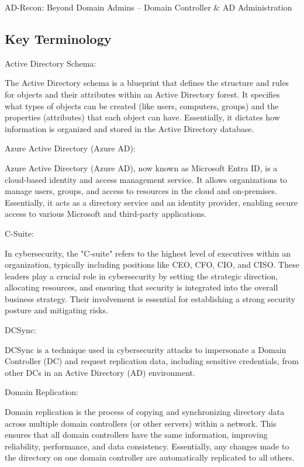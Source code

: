 
AD-Recon: Beyond Domain Admins – Domain Controller \& AD Administration

\subsection{Key Terminology}

Active Directory Schema:

The Active Directory schema is a blueprint that defines the structure and rules for objects and their attributes within an Active Directory forest. It specifies what types of objects can be created (like users, computers, groups) and the properties (attributes) that each object can have. Essentially, it dictates how information is organized and stored in the Active Directory database.

Azure Active Directory (Azure AD):

Azure Active Directory (Azure AD), now known as Microsoft Entra ID, is a cloud-based identity and access management service. It allows organizations to manage users, groups, and access to resources in the cloud and on-premises. Essentially, it acts as a directory service and an identity provider, enabling secure access to various Microsoft and third-party applications.

C-Suite:

In cybersecurity, the "C-suite" refers to the highest level of executives within an organization, typically including positions like CEO, CFO, CIO, and CISO. These leaders play a crucial role in cybersecurity by setting the strategic direction, allocating resources, and ensuring that security is integrated into the overall business strategy. Their involvement is essential for establishing a strong security posture and mitigating risks.

DCSync:

DCSync is a technique used in cybersecurity attacks to impersonate a Domain Controller (DC) and request replication data, including sensitive credentials, from other DCs in an Active Directory (AD) environment.

Domain Replication:

Domain replication is the process of copying and synchronizing directory data across multiple domain controllers (or other servers) within a network. This ensures that all domain controllers have the same information, improving reliability, performance, and data consistency. Essentially, any changes made to the directory on one domain controller are automatically replicated to all others.

